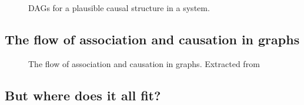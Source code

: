 \documentclass[
  authoryear,
  preprint,
  1p]{elsarticle}
\begin{document}
\begin{figure}
\begin{minipage}{0.33\linewidth}

\end{minipage}%
%
\begin{minipage}{0.33\linewidth}

\centering{

\[
\begin{aligned}
  X & := f_{X}(e_{X}) \\
  T & := f_{Z}(X,e_{T}) \\
  Y & := f_{Y}(T,X,e_{Y}) \\
  e_{T} & \perp\!\!\!\perp e_{X} \\
  e_{T} & \perp\!\!\!\perp e_{Y} \\
  e_{X} & \perp\!\!\!\perp e_{Y}
\end{aligned}
\]

}


\end{minipage}%

\caption{\label{fig-example}DAGs for a plausible causal structure in a
system.}

\end{figure}%

\subsection{The flow of association and causation in
graphs}\label{sec-framework-flow}

\begin{figure}


\caption{\label{fig-ACflow}The flow of association and causation in
graphs. Extracted from \citet[31]{Neal_2020}}

\end{figure}%

\subsection{But where does it all fit?}\label{sec-background-where}
\end{document}
